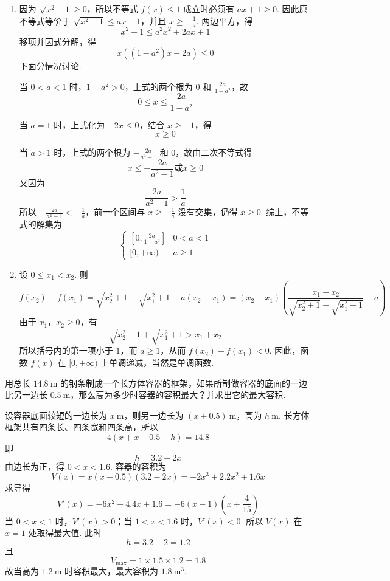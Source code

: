 \begin{solution}
\begin{enumerate}
\item 因为 \(\sqrt{x^{2}+1}\geqslant0\)，所以不等式 \(f(x)\leqslant1\) 成立时必须有 \(ax+1\geqslant0\). 因此原不等式等价于 \(\sqrt{x^{2}+1}\leqslant ax+1\)，并且 \(x\geqslant-\frac{1}{a}\).
两边平方，得
\[
x^{2}+1\leqslant a^{2}x^{2}+2ax+1
\]
移项并因式分解，得
\[
x\left((1-a^{2})x-2a\right)\leqslant0
\]
下面分情况讨论.

当 \(0<a<1\) 时，\(1-a^{2}>0\)，上式的两个根为 \(0\) 和 \(\frac{2a}{1-a^{2}}\)，故
\[
0\leqslant x\leqslant\frac{2a}{1-a^{2}}
\]

当 \(a=1\) 时，上式化为 \(-2x\leqslant0\)，结合 \(x\geqslant-1\)，得
\[
x\geqslant0
\]

当 \(a>1\) 时，上式的两个根为 \(-\frac{2a}{a^{2}-1}\) 和 \(0\)，故由二次不等式得
\[
x\leqslant-\frac{2a}{a^{2}-1}\text{或}x\geqslant0
\]
又因为
\[
\frac{2a}{a^{2}-1}>\frac{1}{a}
\]
所以 \(-\frac{2a}{a^{2}-1}< -\frac{1}{a}\)，前一个区间与 \(x\geqslant-\frac{1}{a}\) 没有交集，仍得 \(x\geqslant0\). 综上，不等式的解集为
\[
\begin{cases}
\left[0,\frac{2a}{1-a^{2}}\right]&0<a<1\\
[0,+\infty)&a\geqslant1
\end{cases}
\]
\item 设 \(0\leqslant x_{1}<x_{2}\). 则
\[
f(x_{2})-f(x_{1})=\sqrt{x_{2}^{2}+1}-\sqrt{x_{1}^{2}+1}-a(x_{2}-x_{1})
=(x_{2}-x_{1})\left(\frac{x_{1}+x_{2}}{\sqrt{x_{2}^{2}+1}+\sqrt{x_{1}^{2}+1}}-a\right)
\]
由于 \(x_{1}\)，\(x_{2}\geqslant0\)，有
\[
\sqrt{x_{2}^{2}+1}+\sqrt{x_{1}^{2}+1}>x_{1}+x_{2}
\]
所以括号内的第一项小于 \(1\)，而 \(a\geqslant1\)，从而 \(f(x_{2})-f(x_{1})<0\). 因此，函数 \(f(x)\) 在 \([0,+\infty)\) 上单调递减，当然是单调函数.
\end{enumerate}
\end{solution}

\begin{problem}
用总长 \(14.8\mathrm{~m}\) 的钢条制成一个长方体容器的框架，如果所制做容器的底面的一边比另一边长 \(0.5\mathrm{~m}\)，那么高为多少时容器的容积最大？并求出它的最大容积.
\end{problem}

\begin{solution}
设容器底面较短的一边长为 \(x\mathrm{~m}\)，则另一边长为 \((x+0.5)\mathrm{~m}\)，高为 \(h\mathrm{~m}\). 长方体框架共有四条长、四条宽和四条高，所以
\[
4\left(x+x+0.5+h\right)=14.8
\]
即
\[
h=3.2-2x
\]
由边长为正，得 \(0<x<1.6\). 容器的容积为
\[
V(x)=x(x+0.5)(3.2-2x)=-2x^{3}+2.2x^{2}+1.6x
\]
求导得
\[
V'(x)=-6x^{2}+4.4x+1.6=-6(x-1)\left(x+\frac{4}{15}\right)
\]
当 \(0<x<1\) 时，\(V'(x)>0\)；当 \(1<x<1.6\) 时，\(V'(x)<0\). 所以 \(V(x)\) 在 \(x=1\) 处取得最大值. 此时
\[
h=3.2-2=1.2
\]
且
\[
V_{\max}=1\times1.5\times1.2=1.8
\]
故当高为 \(1.2\mathrm{~m}\) 时容积最大，最大容积为 \(1.8\mathrm{~m}^{3}\).
\end{solution}

